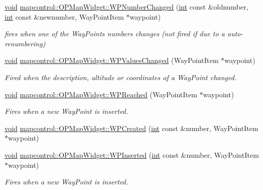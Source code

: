 \begin{DoxyCompactItemize}
\item 
\hyperlink{group___u_a_v_objects_plugin_ga444cf2ff3f0ecbe028adce838d373f5c}{void} \hyperlink{group___o_p_map_widget_gad5aa3c5dba212fe3975e483da178f16c}{mapcontrol\-::\-O\-P\-Map\-Widget\-::\-W\-P\-Number\-Changed} (\hyperlink{ioapi_8h_a787fa3cf048117ba7123753c1e74fcd6}{int} const \&oldnumber, \hyperlink{ioapi_8h_a787fa3cf048117ba7123753c1e74fcd6}{int} const \&newnumber, Way\-Point\-Item $\ast$waypoint)
\begin{DoxyCompactList}\small\item\em fires when one of the Way\-Points numbers changes (not fired if due to a auto-\/renumbering) \end{DoxyCompactList}\item 
\hyperlink{group___u_a_v_objects_plugin_ga444cf2ff3f0ecbe028adce838d373f5c}{void} \hyperlink{group___o_p_map_widget_ga7b05d6d31a9d3dc1fb1bf4d581884f77}{mapcontrol\-::\-O\-P\-Map\-Widget\-::\-W\-P\-Values\-Changed} (Way\-Point\-Item $\ast$waypoint)
\begin{DoxyCompactList}\small\item\em Fired when the description, altitude or coordinates of a Way\-Point changed. \end{DoxyCompactList}\item 
\hyperlink{group___u_a_v_objects_plugin_ga444cf2ff3f0ecbe028adce838d373f5c}{void} \hyperlink{group___o_p_map_widget_gace0e66a97e422c30b79aed508d0be81d}{mapcontrol\-::\-O\-P\-Map\-Widget\-::\-W\-P\-Reached} (Way\-Point\-Item $\ast$waypoint)
\begin{DoxyCompactList}\small\item\em Fires when a new Way\-Point is inserted. \end{DoxyCompactList}\item 
\hyperlink{group___u_a_v_objects_plugin_ga444cf2ff3f0ecbe028adce838d373f5c}{void} \hyperlink{group___o_p_map_widget_ga76a7138d7fd9e231e80d00430c349d03}{mapcontrol\-::\-O\-P\-Map\-Widget\-::\-W\-P\-Created} (\hyperlink{ioapi_8h_a787fa3cf048117ba7123753c1e74fcd6}{int} const \&number, Way\-Point\-Item $\ast$waypoint)
\item 
\hyperlink{group___u_a_v_objects_plugin_ga444cf2ff3f0ecbe028adce838d373f5c}{void} \hyperlink{group___o_p_map_widget_gaacb4d7f71ed1c2874106d276563e1348}{mapcontrol\-::\-O\-P\-Map\-Widget\-::\-W\-P\-Inserted} (\hyperlink{ioapi_8h_a787fa3cf048117ba7123753c1e74fcd6}{int} const \&number, Way\-Point\-Item $\ast$waypoint)
\begin{DoxyCompactList}\small\item\em Fires when a new Way\-Point is inserted. \end{DoxyCompactList}\item 

\end{DoxyCompactItemize}

